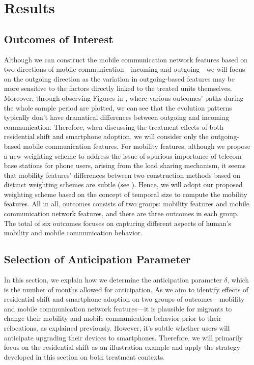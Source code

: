 
\chapter{Results}\label{results}
\section{Outcomes of Interest}
Although we can construct the mobile communication network features based on two directions of mobile communication---incoming and outgoing---we will focus on the outgoing direction as the variation in outgoing-based features may be more sensitive to the factors directly linked to the treated units themselves.
Moreover, through observing Figures in , where various outcomes' paths during the whole sample period are plotted, we can see that the evolution patterns typically don't have dramatical differences between outgoing and incoming communication.
Therefore, when discussing the treatment effects of both residential shift and smartphone adoption, we will consider only the outgoing-based mobile communication features.
For mobility features, although we propose a new weighting scheme to address the issue of spurious importance of telecom base stations for phone users, arising from the load sharing mechanism, it seems that mobility features' differences between two construction methods based on distinct weighting schemes are subtle (see ).
Hence, we will adopt our proposed weighting scheme based on the concept of temporal size to compute the mobility features.
All in all, outcomes consists of two groups: mobility features and mobile communication network features, and there are three outcomes in each group.
The total of six outcomes focuses on capturing different aspects of human's mobility and mobile communication behavior.

\section{Selection of Anticipation Parameter}
In this section, we explain how we determine the anticipation parameter $\delta$, which is the number of months allowed for anticipation.
As we aim to identify effects of residential shift and smartphone adoption on two groups of outcomes---mobility and mobile communication network features---it is plausible for migrants to change their mobility and mobile communication behavior prior to their relocations, as explained previously.
However, it's subtle whether users will anticipate upgrading their devices to smartphones.
Therefore, we will primarily focus on the residential shift as an illustration example and apply the strategy developed in this section on both treatment contexts.

